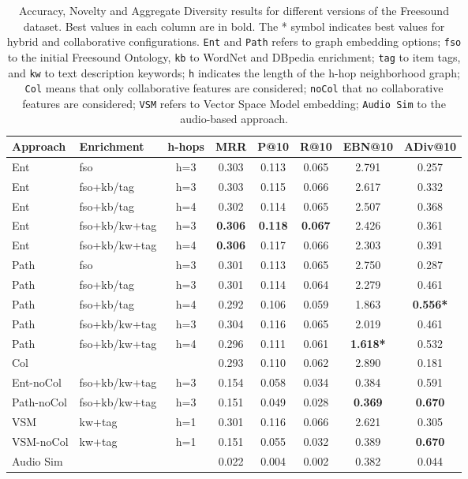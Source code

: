\begin{table}
\scriptsize
	\label{tbl:graph-rec:Res1}
\begin{tabular}{l l c c c c c c }
		\toprule
		\textbf{Approach} & \textbf{Enrichment} & \textbf{h-hops} & \textbf{MRR} &  \textbf{P@10} & \textbf{R@10} & \textbf{EBN@10}  & \textbf{ADiv@10}\\
		\midrule
		Ent & fso & h=3 & 0.303 & 0.113  &  0.065 & 2.791	& 0.257   \\
		Ent & fso+kb/tag & h=3 & 0.303 & 0.115  &  0.066  & 2.617 &	0.332  \\
		Ent & fso+kb/tag & h=4 & 0.302 & 0.114  & 0.065  & 2.507 & 0.368  \\
		Ent & fso+kb/kw+tag & h=3 & \textbf{0.306 }& \textbf{0.118}  &  \textbf{0.067}  & 2.426 &	0.361  \\
		Ent & fso+kb/kw+tag & h=4 & \textbf{0.306}  & 0.117 & 0.066  &2.303  & 0.391   \\ 
		Path & fso & h=3 &  0.301 &  0.113  &  0.065   & 2.750 & 0.287   \\
		Path & fso+kb/tag & h=3 & 0.301 &  0.114 &  0.064 & 2.279 	& 0.461   \\
		Path & fso+kb/tag & h=4 &   0.292 & 0.106 & 0.059   & 1.863 & \textbf{0.556*}   \\
		Path & fso+kb/kw+tag & h=3 &  0.304 & 0.116 &  0.065    & 2.019 &	0.461     \\
		Path & fso+kb/kw+tag & h=4 & 0.296 & 0.111 &	0.061      & \textbf{1.618*}	& 0.532   \\
		\midrule
		Col & & & 0.293 & 0.110 & 0.062 &	2.890 &	0.181 \\	
		Ent-noCol & fso+kb/kw+tag & h=3 & 0.154   & 0.058	 &0.034	  & 0.384	& 0.591   \\		
		Path-noCol & fso+kb/kw+tag & h=3 & 0.151 & 0.049 & 0.028  & \textbf{0.369} & \textbf{0.670}   \\			
		VSM & kw+tag & h=1 & 0.301 &   0.116 &  0.066  & 2.621 &	0.305 \\
		VSM-noCol & kw+tag & h=1 & 0.151  & 0.055 	 & 0.032	& 0.389 & \textbf{0.670} \\
		Audio Sim & & & 0.022 & 0.004 & 0.002 &	0.382	&	0.044 \\
		\bottomrule
	\end{tabular}
	
	\caption{Accuracy, Novelty and Aggregate Diversity results for different versions of the Freesound dataset. Best values in each column are in bold. The * symbol indicates best values for hybrid and collaborative configurations. \texttt{Ent} and \texttt{Path} refers to graph embedding options; \texttt{fso} to the initial Freesound Ontology, \texttt{kb} to WordNet and DBpedia enrichment; \texttt{tag} to item tags, and \texttt{kw} to text description keywords; \texttt{h} indicates the length of the h-hop neighborhood graph; \texttt{Col} means that only collaborative features are considered; \texttt{noCol} that no collaborative features are considered; \texttt{VSM} refers to Vector Space Model embedding; \texttt{Audio Sim}  to the audio-based approach.
	}
\end{table}
